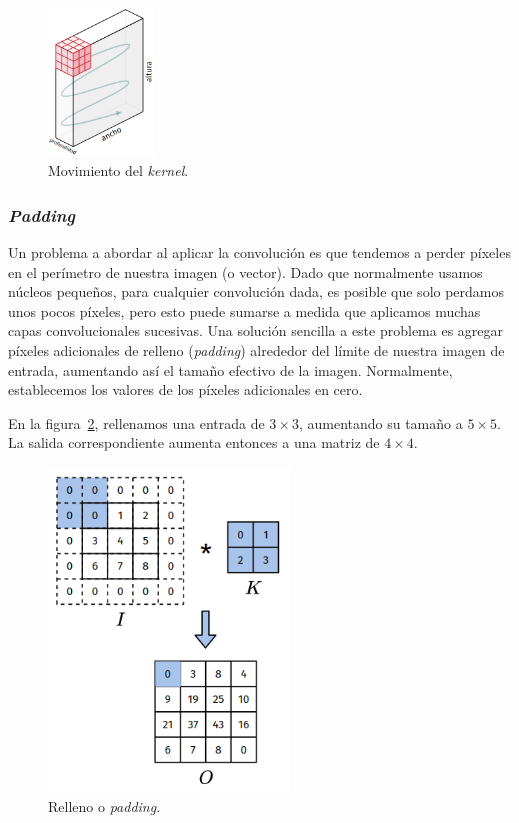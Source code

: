 \documentclass[a4paper,12pt]{article}
\begin{document}
\begin{figure}[H]
	\begin{center}				
		\includegraphics[width=0.25\textwidth]{kernelmove.png}
		\caption{Movimiento del \textit{kernel}.}
		\label{fig:kernelmove}
	\end{center}
\end{figure}

\subsubsection{\textit{Padding}}

Un problema a abordar al aplicar la convolución es que tendemos a perder píxeles en el perímetro de nuestra imagen (o vector). Dado que normalmente usamos núcleos pequeños, para cualquier convolución dada, es posible que solo perdamos unos pocos píxeles, pero esto puede sumarse a medida que aplicamos muchas capas convolucionales sucesivas. Una solución sencilla a este problema es agregar píxeles adicionales de relleno (\textit{padding}) alrededor del límite de nuestra imagen de entrada, aumentando así el tamaño efectivo de la imagen. Normalmente, establecemos los valores de los píxeles adicionales en cero. \citep{padding}

En la figura~\ref{fig:padding}, rellenamos una entrada de $3 \times 3$, aumentando su tamaño a $5 \times 5$. La salida correspondiente aumenta entonces a una matriz de $4 \times 4$.

\begin{figure}[H]
	\begin{center}				
		\includegraphics[width=0.57\textwidth]{conv-pad.png}
		\caption{Relleno o \textit{padding}.}
		\label{fig:padding}
	\end{center}
\end{figure}
\end{document}
